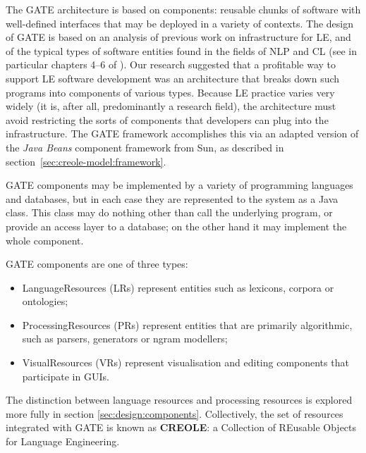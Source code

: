 %
%
%
%


The GATE architecture is based on components: reusable chunks of software
with well-defined interfaces that may be deployed in a variety of contexts.
The design of GATE is based on an analysis of previous work on
infrastructure for LE, and of the typical types of software entities
found in the fields of NLP and CL (see in particular chapters 4--6
of \cite{Cun00a}). Our research suggested that a profitable way
to support LE software development was an architecture that
breaks down such programs into components of various types.
Because LE practice varies very widely (it is, after all, predominantly
a research field), the architecture must avoid restricting the sorts
of components that developers can plug into the infrastructure.
The GATE framework accomplishes this via an adapted
version of the {\em Java Beans} component framework from Sun, as described in
section~\ref{sec:creole-model:framework}.

GATE components may be implemented by a variety of programming languages and
databases, but in each case they are represented to the system as a Java
class. This class may do nothing other than call the underlying program, or
provide an access layer to a database; on the other hand
it may implement the whole component.

GATE components are one of three types:
%
\begin{itemize}
%
\item
LanguageResources (LRs) represent entities such as lexicons, corpora or
ontologies;
%
\item
ProcessingResources (PRs) represent entities that are primarily algorithmic,
such as parsers, generators or ngram modellers;
%
\item
VisualResources (VRs) represent visualisation and editing components that
participate in GUIs.
%
\end{itemize}
%
\ifprintedbook
\else
The distinction between language resources and processing resources is explored more fully in section \ref{sec:design:components}.
\fi
Collectively, the set of resources integrated with GATE is known as
{\bf CREOLE}: a
Collection of REusable Objects for Language Engineering.

